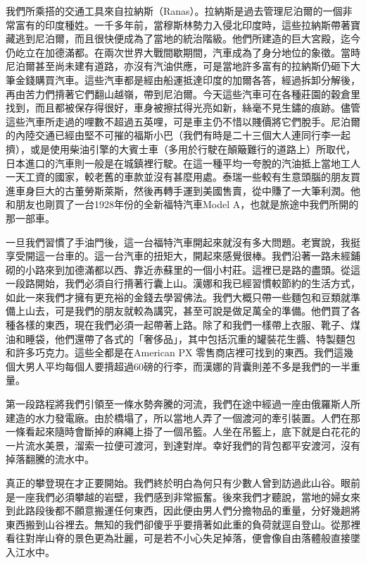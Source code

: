 我們所乘搭的交通工具來自拉納斯（Ranas）。拉納斯是過去管理尼泊爾的一個非常富有的印度種姓。一千多年前，當穆斯林勢力入侵北印度時，這些拉納斯帶著寶藏逃到尼泊爾，而且很快便成為了當地的統治階級。他們所建造的巨大宮殿，迄今仍屹立在加德滿都。在兩次世界大戰間歇期間，汽車成為了身分地位的象徵。當時尼泊爾甚至尚未建有道路，亦沒有汽油供應，可是當地許多富有的拉納斯仍砸下大筆金錢購買汽車。這些汽車都是經由船運抵達印度的加爾各答，經過拆卸分解後，再由苦力們揹著它們翻山越嶺，帶到尼泊爾。今天這些汽車可在各種莊園的穀倉里找到，而且都被保存得很好，車身被擦拭得光亮如新，絲毫不見生鏽的痕跡。儘管這些汽車所走過的哩數不超過五英哩，可是車主仍不惜以賤價將它們脫手。尼泊爾的內陸交通已經由堅不可摧的福斯小巴（我們有時是二十三個大人連同行李一起擠），或是使用柴油引擎的大賓士車（多用於行駛在顛簸難行的道路上）所取代，日本進口的汽車則一般是在城鎮裡行駛。在這一種平均一夸脫的汽油抵上當地工人一天工資的國家，較老舊的車款並沒有甚麼用處。泰瑞一些較有生意頭腦的朋友買進車身巨大的古董勞斯萊斯，然後再轉手運到美國售賣，從中賺了一大筆利潤。他和朋友也剛買了一台1928年份的全新福特汽車Model
A，也就是旅途中我們所開的那一部車。

一旦我們習慣了手油門後，這一台福特汽車開起來就沒有多大問題。老實說，我挺享受開這一台車的。這一台汽車的扭矩大，開起來感覺很棒。我們沿著一路未經鋪砌的小路來到加德滿都以西、靠近赤蘇里的一個小村莊。這裡已是路的盡頭。從這一段路開始，我們必須自行揹著行囊上山。漢娜和我已經習慣較節約的生活方式，如此一來我們才擁有更充裕的金錢去學習佛法。我們大概只帶一些麵包和豆類就準備上山去，可是我們的朋友就較為講究，甚至可說是做足萬全的準備。他們買了各種各樣的東西，現在我們必須一起帶著上路。除了和我們一樣帶上衣服、靴子、煤油和睡袋，他們還帶了各式的「奢侈品」，其中包括沉重的罐裝花生醬、特製麵包和許多巧克力。這些全都是在American
PX
零售商店裡可找到的東西。我們這幾個大男人平均每個人要揹超過60磅的行李，而漢娜的背囊則差不多是我們的一半重量。

第一段路程將我們引領至一條水勢奔騰的河流，我們在途中經過一座由俄羅斯人所建造的水力發電廠。由於橋塌了，所以當地人弄了一個渡河的牽引裝置。人們在那一條看起來隨時會斷掉的麻繩上掛了一個吊籃。人坐在吊籃上，底下就是白花花的一片流水美景，溜索一拉便可渡河，到達對岸。幸好我們的背包都平安渡河，沒有掉落翻騰的流水中。

真正的攀登現在才正要開始。我們終於明白為何只有少數人曾到訪過此山谷。眼前是一座我們必須攀越的岩壁，我們感到非常振奮。後來我們才聽說，當地的婦女來到此路段後都不願意搬運任何東西，因此便由男人們分擔物品的重量，分好幾趟將東西搬到山谷裡去。無知的我們卻傻乎乎要揹著如此重的負荷就逕自登山。從那裡看往對岸山脊的景色更為壯麗，可是若不小心失足掉落，便會像自由落體般直接墜入江水中。

